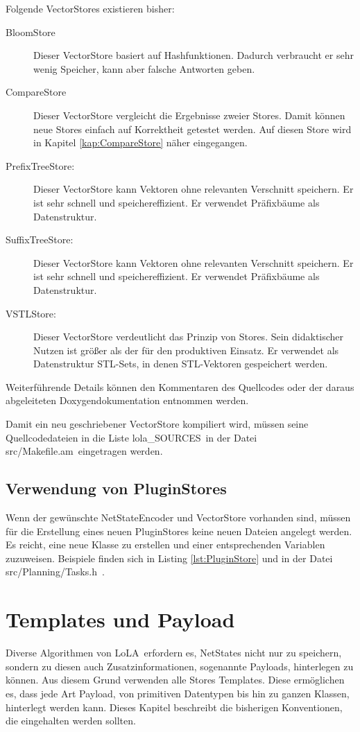 \documentclass[12pt,a4paper,titlepage]{scrartcl}
\renewcommand \( {\left (}
\renewcommand \) {\right )}
\renewcommand \[ {\left [}
\renewcommand \] {\right ]}
\newcommand \Flqq {\flqq\ }
\newcommand{\lola}{\frqq LoLA\Flqq}
\begin{document}
Folgende VectorStores existieren bisher:
\begin{description}
\item[BloomStore] Dieser VectorStore basiert auf Hashfunktionen. Dadurch verbraucht er sehr wenig Speicher, kann aber falsche Antworten geben.
\item[CompareStore] Dieser VectorStore vergleicht die Ergebnisse zweier Stores. Damit können neue Stores einfach auf Korrektheit getestet werden. Auf diesen Store wird in Kapitel \ref{kap:CompareStore} näher eingegangen.
\item[PrefixTreeStore:] Dieser VectorStore kann Vektoren ohne relevanten Verschnitt speichern. Er ist sehr schnell und speichereffizient. Er verwendet Präfixbäume als Datenstruktur.
\item[SuffixTreeStore:] Dieser VectorStore kann Vektoren ohne relevanten Verschnitt speichern. Er ist sehr schnell und speichereffizient. Er verwendet Präfixbäume als Datenstruktur.
\item[VSTLStore:] Dieser VectorStore verdeutlicht das Prinzip von Stores. Sein didaktischer Nutzen ist größer als der für den produktiven Einsatz. Er verwendet als Datenstruktur STL-Sets, in denen STL-Vektoren gespeichert werden.
\end{description}

Weiterführende Details können den Kommentaren des Quellcodes oder der daraus abgeleiteten Doxygendokumentation entnommen werden.

Damit ein neu geschriebener VectorStore kompiliert wird, müssen seine Quellcodedateien in die Liste \frqq lola\_SOURCES\Flqq in der Datei \frqq src/Makefile.am\Flqq eingetragen werden.

\subsection{Verwendung von PluginStores}
Wenn der gewünschte NetStateEncoder und VectorStore vorhanden sind, müssen für die Erstellung eines neuen PluginStores keine neuen Dateien angelegt werden. Es reicht, eine neue Klasse zu erstellen und einer entsprechenden Variablen zuzuweisen. Beispiele finden sich in Listing \ref{lst:PluginStore} und in der Datei \frqq src/Planning/Tasks.h\Flqq.

\section{Templates und Payload}
Diverse Algorithmen von \lola erfordern es, NetStates nicht nur zu speichern, sondern zu diesen auch Zusatzinformationen, sogenannte Payloads, hinterlegen zu können. Aus diesem Grund verwenden alle Stores Templates. Diese ermöglichen es, dass jede Art Payload, von primitiven Datentypen bis hin zu ganzen Klassen, hinterlegt werden kann. Dieses Kapitel beschreibt die bisherigen Konventionen, die eingehalten werden sollten.
\end{document}
